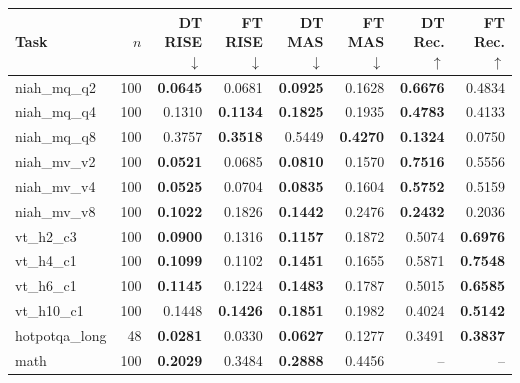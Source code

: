 \begin{tabular}{lrrrrrrr}
\toprule
Task & $n$ & DT RISE $\downarrow$ & FT RISE $\downarrow$ & DT MAS $\downarrow$ & FT MAS $\downarrow$ & DT Rec. $\uparrow$ & FT Rec. $\uparrow$ \\
\midrule
niah\_mq\_q2 & 100 & \textbf{0.0645} & 0.0681 & \textbf{0.0925} & 0.1628 & \textbf{0.6676} & 0.4834 \\
niah\_mq\_q4 & 100 & 0.1310 & \textbf{0.1134} & \textbf{0.1825} & 0.1935 & \textbf{0.4783} & 0.4133 \\
niah\_mq\_q8 & 100 & 0.3757 & \textbf{0.3518} & 0.5449 & \textbf{0.4270} & \textbf{0.1324} & 0.0750 \\
niah\_mv\_v2 & 100 & \textbf{0.0521} & 0.0685 & \textbf{0.0810} & 0.1570 & \textbf{0.7516} & 0.5556 \\
niah\_mv\_v4 & 100 & \textbf{0.0525} & 0.0704 & \textbf{0.0835} & 0.1604 & \textbf{0.5752} & 0.5159 \\
niah\_mv\_v8 & 100 & \textbf{0.1022} & 0.1826 & \textbf{0.1442} & 0.2476 & \textbf{0.2432} & 0.2036 \\
vt\_h2\_c3 & 100 & \textbf{0.0900} & 0.1316 & \textbf{0.1157} & 0.1872 & 0.5074 & \textbf{0.6976} \\
vt\_h4\_c1 & 100 & \textbf{0.1099} & 0.1102 & \textbf{0.1451} & 0.1655 & 0.5871 & \textbf{0.7548} \\
vt\_h6\_c1 & 100 & \textbf{0.1145} & 0.1224 & \textbf{0.1483} & 0.1787 & 0.5015 & \textbf{0.6585} \\
vt\_h10\_c1 & 100 & 0.1448 & \textbf{0.1426} & \textbf{0.1851} & 0.1982 & 0.4024 & \textbf{0.5142} \\
hotpotqa\_long & 48 & \textbf{0.0281} & 0.0330 & \textbf{0.0627} & 0.1277 & 0.3491 & \textbf{0.3837} \\
math & 100 & \textbf{0.2029} & 0.3484 & \textbf{0.2888} & 0.4456 & -- & -- \\
\bottomrule
\end{tabular}
